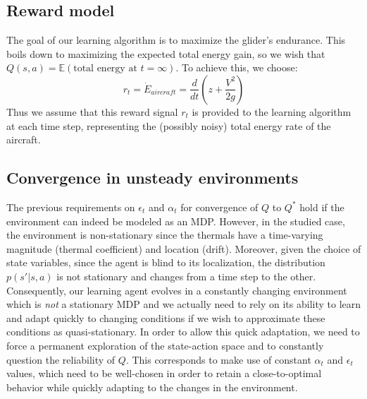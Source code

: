 \documentclass[a4paper, 10pt, conference]{ieeeconf}
\begin{document}
\subsection{Reward model}

The goal of our learning algorithm is to maximize the glider's endurance. This boils down to maximizing the expected total energy gain, so we wish that $Q(s,a)=\mathbb{E}\left(\textrm{total energy at }t=\infty\right)$. To achieve this, we choose:
\begin{equation}
r_{t} = \dot{E}_{aircraft} = \frac{d}{dt} \left( z + \frac{V^2}{2g}\right)
\end{equation}
Thus we assume that this reward signal $r_t$ is provided to the learning algorithm at each time step, representing the (possibly noisy) total energy rate of the aircraft.

\subsection{Convergence in unsteady environments}

The previous requirements on $\epsilon_t$ and $\alpha_t$ for convergence of $Q$ to $Q^*$ hold if the environment can indeed be modeled as an MDP.
However, in the studied case, the environment is non-stationary since the thermals have a time-varying magnitude (thermal coefficient) and location (drift). Moreover, given the choice of state variables, since the agent is blind to its localization, the distribution $p(s'|s,a)$ is not stationary and changes from a time step to the other.
Consequently, our learning agent evolves in a constantly changing environment which is \emph{not} a stationary MDP and we actually need to rely on its ability to learn and adapt quickly to changing conditions if we wish to approximate these conditions as quasi-stationary. In order to allow this quick adaptation, we need to force a permanent exploration of the state-action space and to constantly question the reliability of $Q$. This corresponds to make use of constant $\alpha_t$ and $\epsilon_t$ values, which need to be well-chosen in order to retain a close-to-optimal behavior while quickly adapting to the changes in the environment.
\end{document}
